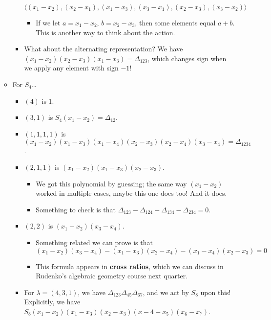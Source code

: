\documentclass[../notes.tex]{subfiles}
\begin{document}
\begin{itemize}
\begin{itemize}
\begin{itemize}
            \begin{equation*}
                \langle (x_1-x_2),(x_2-x_1),(x_1-x_3),(x_3-x_1),(x_2-x_3),(x_3-x_2) \rangle
            \end{equation*}
            \begin{itemize}
                \item If we let $a=x_1-x_2$, $b=x_2-x_3$, then some elements equal $a+b$. This is another way to think about the action.
            \end{itemize}
            \item What about the alternating representation? We have $(x_1-x_2)(x_2-x_3)(x_1-x_3)=\Delta_{123}$, which changes sign when we apply any element with sign $-1$!
        \end{itemize}
        \item For $S_4$\dots
        \begin{itemize}
            \item $(4)$ is 1.
            \item $(3,1)$ is $S_4(x_1-x_2)=\Delta_{12}$.
            \item $(1,1,1,1)$ is $(x_1-x_2)(x_1-x_3)(x_1-x_4)(x_2-x_3)(x_2-x_4)(x_3-x_4)=\Delta_{1234}$.
            \item $(2,1,1)$ is $(x_1-x_2)(x_1-x_3)(x_2-x_3)$.
            \begin{itemize}
                \item We got this polynomial by guessing; the same way $(x_1-x_2)$ worked in multiple cases, maybe this one does too! And it does.
                \item Something to check is that $\Delta_{123}-\Delta_{124}-\Delta_{134}-\Delta_{234}=0$.
            \end{itemize}
            \item $(2,2)$ is $(x_1-x_2)(x_3-x_4)$.
            \begin{itemize}
                \item Something related we can prove is that
                \begin{equation*}
                    (x_1-x_2)(x_3-x_4)-(x_1-x_3)(x_2-x_4)-(x_1-x_4)(x_2-x_3) = 0
                \end{equation*}
                \item This formula appears in \textbf{cross ratios}, which we can discuss in Rudenko's algebraic geometry course next quarter.
            \end{itemize}
            \item For $\lambda=(4,3,1)$, we have $\Delta_{123}\Delta_{45}\Delta_{67}$, and we act by $S_8$ upon this! Explicitly, we have $S_8(x_1-x_2)(x_1-x_3)(x_2-x_3)(x-4-x_5)(x_6-x_7)$.

\end{itemize}
\end{itemize}
\end{itemize}
\end{document}
